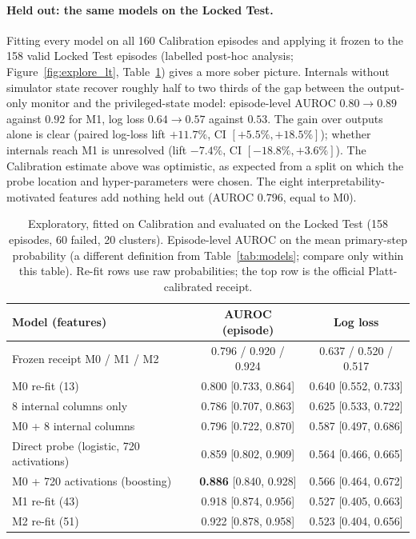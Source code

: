 \documentclass[11pt,a4paper]{article}
\newcommand{\Mz}{M0}\newcommand{\Mo}{M1}\newcommand{\Mt}{M2}
\begin{document}
\paragraph{Held out: the same models on the Locked Test.} Fitting every model on all 160 Calibration episodes and applying it frozen to the 158 valid Locked Test episodes (labelled post-hoc analysis; Figure~\ref{fig:explore_lt}, Table~\ref{tab:explore_lt}) gives a more sober picture. Internals without simulator state recover roughly half to two thirds of the gap between the output-only monitor and the privileged-state model: episode-level AUROC $0.80 \to 0.89$ against $0.92$ for \Mo{}, log loss $0.64 \to 0.57$ against $0.53$. The gain over outputs alone is clear (paired log-loss lift $+11.7\%$, CI $[+5.5\%, +18.5\%]$); whether internals reach \Mo{} is unresolved (lift $-7.4\%$, CI $[-18.8\%, +3.6\%]$). The Calibration estimate above was optimistic, as expected from a split on which the probe location and hyper-parameters were chosen. The eight interpretability-motivated features add nothing held out (AUROC $0.796$, equal to \Mz{}).

\begin{table}[htbp]
\centering\small
\caption{Exploratory, fitted on Calibration and evaluated on the Locked Test (158 episodes, 60 failed, 20 clusters). Episode-level AUROC on the mean primary-step probability (a different definition from Table~\ref{tab:models}; compare only within this table). Re-fit rows use raw probabilities; the top row is the official Platt-calibrated receipt.}
\label{tab:explore_lt}
\begin{tabular}{lcc}
\toprule
Model (features) & AUROC (episode) & Log loss \\
\midrule
Frozen receipt \Mz{} / \Mo{} / \Mt{} & 0.796 / 0.920 / 0.924 & 0.637 / 0.520 / 0.517 \\
\Mz{} re-fit (13) & 0.800 [0.733, 0.864] & 0.640 [0.552, 0.733] \\
8 internal columns only & 0.786 [0.707, 0.863] & 0.625 [0.533, 0.722] \\
\Mz{} + 8 internal columns & 0.796 [0.722, 0.870] & 0.587 [0.497, 0.686] \\
Direct probe (logistic, 720 activations) & 0.859 [0.802, 0.909] & 0.564 [0.466, 0.665] \\
\Mz{} + 720 activations (boosting) & \textbf{0.886} [0.840, 0.928] & 0.566 [0.464, 0.672] \\
\Mo{} re-fit (43) & 0.918 [0.874, 0.956] & 0.527 [0.405, 0.663] \\
\Mt{} re-fit (51) & 0.922 [0.878, 0.958] & 0.523 [0.404, 0.656] \\
\bottomrule
\end{tabular}
\end{table}
\end{document}
